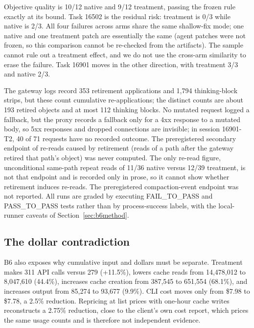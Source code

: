 \documentclass[10pt,twocolumn]{article}
\begin{document}
Objective quality is 10/12 native and 9/12 treatment, passing the frozen rule exactly at its bound.
Task 16502 is the residual risk: treatment is 0/3 while native is 2/3.  All four failures across arms
share the same shallow-fix mode; one native and one treatment patch are essentially the same (agent
patches were not frozen, so this comparison cannot be re-checked from the artifacts).  The sample
cannot rule out a treatment effect, and we do not use the cross-arm similarity to erase the failure.
Task 16901 moves in the other direction, with treatment 3/3 and native 2/3.

The gateway logs record 353 retirement applications and 1,794 thinking-block strips, but these count
cumulative re-applications; the distinct counts are about 193 retired objects and at most 112 thinking
blocks.  No mutated request logged a fallback, but the proxy records a fallback only for a 4xx response
to a mutated body, so 5xx responses and dropped connections are invisible; in session 16901-T2, 40 of
71 requests have no recorded outcome.  The preregistered secondary endpoint of re-reads caused by
retirement (reads of a path after the gateway retired that path's object) was never computed.  The only
re-read figure, unconditional same-path repeat reads of 11/36 native versus 12/39 treatment, is not that
endpoint and is recorded only in prose, so it cannot show whether retirement induces re-reads.  The
preregistered compaction-event endpoint was not reported.  All runs are graded by executing
FAIL\_TO\_PASS and PASS\_TO\_PASS tests rather than by process-success labels, with the local-runner
caveats of Section~\ref{sec:b6method}.


\subsection{The dollar contradiction}

B6 also exposes why cumulative input and dollars must be separate.  Treatment makes 311 API calls
versus 279 (+11.5\%), lowers cache reads from 14,478,012 to 8,047,610 (44.4\%), increases cache
creation from 387,545 to 651,554 (68.1\%), and increases output from 85,274 to 93,677 (9.9\%).  CLI
cost moves only from \$7.98 to \$7.78, a 2.5\% reduction.  Repricing at list prices with one-hour cache
writes reconstructs a 2.75\% reduction, close to the client's own cost report, which prices the same
usage counts and is therefore not independent evidence.
\end{document}
